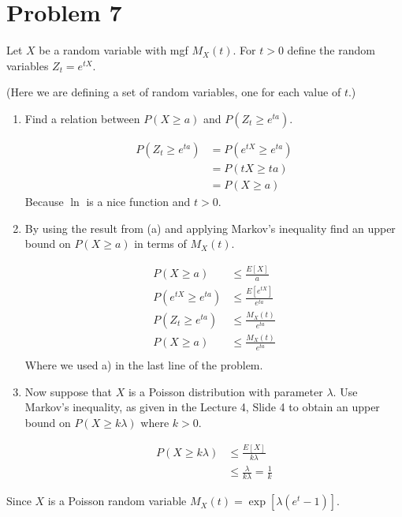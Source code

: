 \documentclass{article}
\newcommand{\1}{\mathbf{1}}
\begin{document}
\section*{Problem 7}
Let $X$ be a random variable with mgf $M_X(t)$. For $t >0$ define the random variables $Z_t = e^{tX}$.\par 
(Here we are defining a set of random variables, one for each value of $t$.)
\begin{enumerate}
    \item Find a relation between $P(X \geq a)$ and $P(Z_t \geq e^{ta})$. 
    
    \begin{align*}
        P(Z_t \geq e^{ta}) &= P(e^{tX} \geq e^{ta}) \\
        &= P(tX \geq ta) \\
        &= P(X \geq a)
    \end{align*}
    Because $\ln$ is a nice function and $t>0$. 
    
    \item By using the result from (a) and applying Markov's inequality find an upper bound on {\color{blue} $P(X \geq a)$} in terms of $M_X(t)$. 
    
    \begin{align*}
        P(X \geq a) &\leq \frac{E[X]}{a} \\
        P(e^{tX} \geq e^{ta}) &\leq \frac{E[e^{tX}]}{e^{ta}} \\
        P(Z_t \geq e^{ta}) &\leq \frac{M_X(t)}{e^{ta}} \\
        P(X \geq a) &\leq \frac{M_X(t)}{e^{ta}} \\
    \end{align*}
    Where we used a) in the last line of the problem. 
    
    \item Now suppose that $X$ is a Poisson distribution with parameter  $\lambda$. Use Markov's inequality, as given in the Lecture 4, Slide 4 to obtain an upper bound on $P(X \geq k\lambda)$ where $k> 0$.
    
    \begin{align*}
        P(X \geq k\lambda) &\leq \frac{E[X]}{k\lambda} \\
        &\leq \frac{\lambda}{k\lambda} = \frac{1}{k}
    \end{align*}
    
\end{enumerate}

Since $X$ is a Poisson random variable $M_X(t) = \exp\left[\lambda(e^t - 1)\right]$. 
\end{document}
